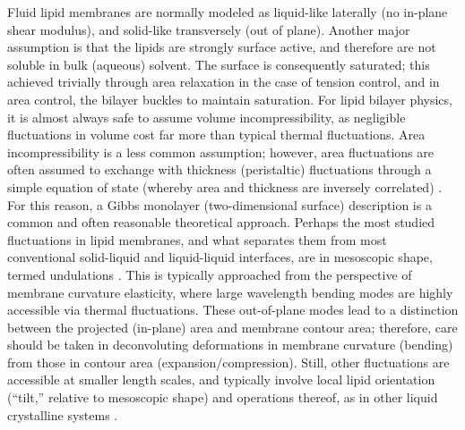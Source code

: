 \documentclass[9pt,bestpractices]{livecoms}
\begin{document}
Fluid lipid membranes are normally modeled as liquid-like laterally (no in-plane shear modulus), and solid-like transversely (out of plane).
Another major assumption is that the lipids are strongly surface active, and therefore are not soluble in bulk (aqueous) solvent.
The surface is consequently saturated; this achieved trivially through area relaxation in the case of tension control, and in area control, the bilayer buckles to maintain saturation.
For lipid bilayer physics, it is almost always safe to assume volume incompressibility, as negligible fluctuations in volume cost far more than typical thermal fluctuations.
Area incompressibility is a less common assumption; however, area fluctuations are often assumed to exchange with thickness (peristaltic) fluctuations through a simple equation of state (whereby area and thickness are inversely correlated) \cite{Safran1994}.
For this reason, a Gibbs monolayer (two-dimensional surface) description is a common and often reasonable theoretical approach.
Perhaps the most studied fluctuations in lipid membranes, and what separates them from most conventional solid-liquid and liquid-liquid interfaces, are in mesoscopic shape, termed undulations \cite{Canham1970b,Helfrich1973a}.
This is typically approached from the perspective of membrane curvature elasticity, where large wavelength bending modes are highly accessible via thermal fluctuations.
These out-of-plane modes lead to a distinction between the projected (in-plane) area and membrane contour area; therefore, care should be taken in deconvoluting deformations in membrane curvature (bending) from those in contour area (expansion/compression).
Still, other fluctuations are accessible at smaller length scales, and typically involve local lipid orientation (``tilt,'' relative to mesoscopic shape) and operations thereof, as in other liquid crystalline systems \cite{Hamm2000,May2007,Watson2011a,Watson2013b}.
\end{document}

